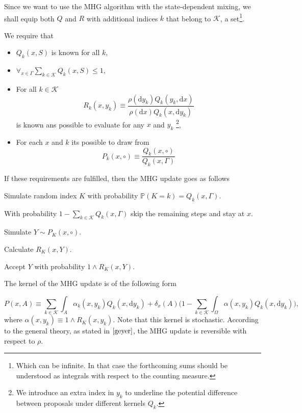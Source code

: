 Since we want to use the MHG algorithm with the state-dependent mixing, we shall equip both $Q$ and $R$ with additional indices $k$ that belong to $\mathcal{K}$, a set\footnote{Which can be infinite. In that case the forthcoming sums should be understood as integrals with respect to the counting measure.}.  

We require that

\begin{itemize}
	\item $Q_k (x,S)$ is known for all $k$,
	\item $\forall_{x \in \Gamma} \underset{ k \in \mathcal{K}}{\sum} Q_k (x,S) \leq 1$,
	\item For all $k \in \mathcal{K}$ $$R_k (x,y_k) \equiv \frac{\rho(\mathrm{d } y_k)Q_k (y_k, \mathrm{d }x)}{\rho(\mathrm{d } x)Q_k (x, \mathrm{d }y_k)}$$ is known ans possible to evaluate for any $x$ and $y_k$ \footnote{We introduce an extra index in $y_k$ to underline the potential difference between proposals under different kernels $Q_k$.},
	\item For each $x$ and $k$ its possible to draw from $$P_k(x, \circ) \equiv \frac{Q_k (x, \circ)}{Q_k (x, \Gamma)}$$
\end{itemize}

If these requirements are fulfilled, then the MHG update goes as follows

\begin{enumarate}
	\item Simulate random index $K$ with probability $\mathbb{P}( K = k ) = Q_k (x,\Gamma)$.
	\item[] With probability $1-\underset{k \in \mathcal{K}}{\sum} Q_k (x,\Gamma)$ skip the remaining steps and stay at $x$.
	\item Simulate $Y \sim P_K (x, \circ)$.
	\item Calculate $R_K (x,Y)$.
	\item Accept $Y$ with probability $1\wedge R_K (x,Y)$.
\end{enumarate}

	The kernel of the MHG update is of the following form
	
	$$P(x,A) \equiv \underset{k \in \mathcal{K}}{\sum} \int_A \alpha_k (x,y_k) Q_k(x, \mathrm{d }y_k) + \delta_x (A) \Big(1 - \underset{k \in \mathcal{K}}{\sum} \int_{\Omega} \alpha(x,y_k) Q_k(x,\mathrm{d }y_k) \Big), $$
	where $\alpha(x,y_k) \equiv 1\wedge R_K (x,y_k)$. Note that this kernel is stochastic. According to the general theory, as stated in $\cite{geyer}$, the MHG update is reversible with respect to $\rho$. 

